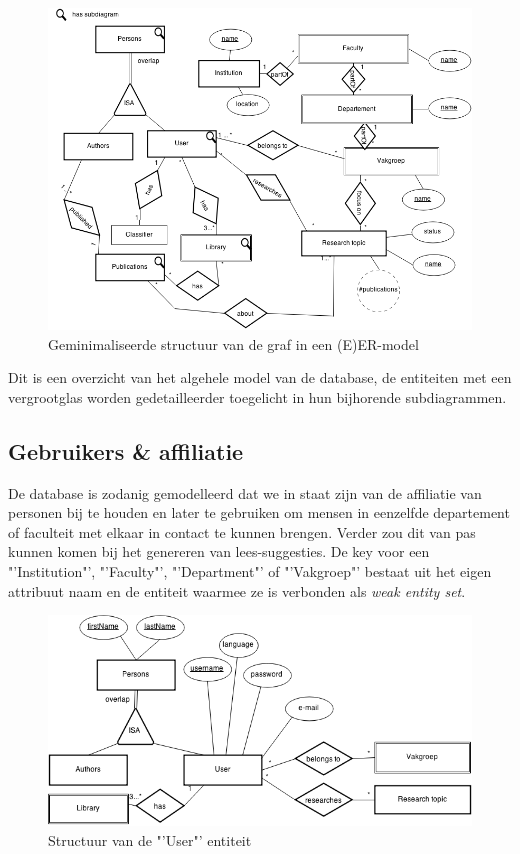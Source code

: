 \documentclass{article}
\begin{document}
\begin{figure}[!h]
\centering
 \includegraphics[width=149mm]{minimised_er_diagram_v3.png}
 \caption{Geminimaliseerde structuur van de graf in een (E)ER-model}
 \label{ER-model}
\end{figure}

Dit is een overzicht van het algehele model van de database, de entiteiten met een vergrootglas worden gedetailleerder toegelicht in hun bijhorende subdiagrammen.\\

\subsection{Gebruikers \& affiliatie}

De database is zodanig gemodelleerd dat we in staat zijn van de affiliatie van personen bij te houden en later te gebruiken om mensen in eenzelfde departement of faculteit met elkaar in contact te kunnen brengen. Verder zou dit van pas kunnen komen bij het genereren van lees-suggesties. De key voor een "'Institution"', "'Faculty"', "'Department"' of "'Vakgroep"' bestaat uit het eigen attribuut naam en de entiteit waarmee ze is verbonden als \textit{weak entity set}.\\

\begin{figure}[!h]
\centering
 \includegraphics[width=145mm]{user_diagram.png}
 \caption{Structuur van de "'User"' entiteit}
 \label{User-model}
\end{figure}
\end{document}
